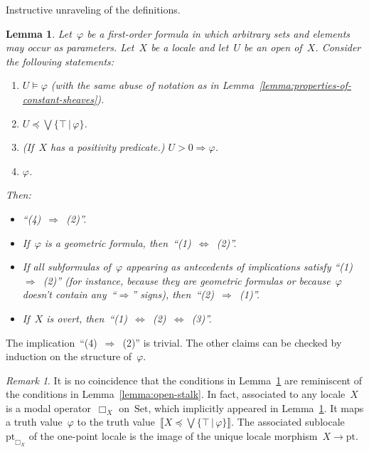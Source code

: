 \documentclass[10pt,reqno,a4paper]{amsbook}
\makeatletter
\theoremstyle{definition}
\theoremstyle{plain}
\newtheorem{lemma}[defn]{Lemma}
\theoremstyle{remark}
\newtheorem{rem}[defn]{Remark}
\newcommand{\Set}{\mathrm{Set}}
\newcommand{\pt}{\mathrm{pt}}
\newcommand{\?}{\,{:}\,}
\renewcommand{\_}{\mathpunct{.}\,}
\newcommand{\brak}[1]{{\llbracket{#1}\rrbracket}}
\renewenvironment{proof}[1][\proofname]{\par
  \pushQED{\qed}%
  \normalfont \topsep6\p@\@plus6\p@\relax
  \trivlist
  \item[\hskip\labelsep
        \itshape
    #1\@addpunct{.}]\ignorespaces
}{%
  \popQED\endtrivlist\@endpefalse
}
\makeatother
\begin{document}
{\begin{proof}Instructive unraveling of the definitions.
\end{proof}

\begin{lemma}\label{lemma:properties-of-constant-sheaves-over-locales}
Let~$\varphi$ be a first-order formula in which arbitrary sets and elements may
occur as parameters. Let~$X$ be a locale and let~$U$ be an open of~$X$.
Consider the following statements:
\begin{enumerate}
\item $U \models \varphi$ (with the same abuse of notation as in
Lemma~\ref{lemma:properties-of-constant-sheaves}).
\item $U \preceq \bigvee \{ \top \,|\, \varphi \}$.
\item (If~$X$ has a positivity predicate.) $U > 0 \Longrightarrow \varphi$.
\item $\varphi$.
\end{enumerate}
Then:
\begin{itemize}
\item ``(4)~$\Rightarrow$~(2)''.
\item If~$\varphi$ is a geometric formula, then~``(1)~$\Leftrightarrow$~(2)''.
\item If all subformulas of~$\varphi$ appearing as antecedents of implications
satisfy ``(1)~$\Rightarrow$~(2)'' (for instance, because they are geometric
formulas or because~$\varphi$ doesn't contain any~``$\Rightarrow$'' signs),
then~``(2)~$\Rightarrow$~(1)''.
\item If~$X$ is overt, then~``(1)~$\Leftrightarrow$~(2)~$\Leftrightarrow$~(3)''.
\end{itemize}
\end{lemma}

\begin{proof}The implication~``(4)~$\Rightarrow$~(2)'' is trivial. The other
claims can be checked by induction on the structure of~$\varphi$.
\end{proof}

\begin{rem}It is no coincidence that the conditions in
Lemma~\ref{lemma:properties-of-constant-sheaves-over-locales} are reminiscent
of the conditions in Lemma~\ref{lemma:open-stalk}. In fact, associated to any
locale~$X$ is a modal operator~$\Box_X$ on~$\Set$, which implicitly appeared in
Lemma~\ref{lemma:properties-of-constant-sheaves-over-locales}. It maps a truth
value~$\varphi$ to the truth value~$\brak{X \preceq
\bigvee\{\top\,|\,\varphi\}}$. The associated sublocale~$\pt_{\Box_X}$ of the
one-point locale is the image of the unique locale morphism~$X \to \pt$.\end{rem}

}
\end{document}
